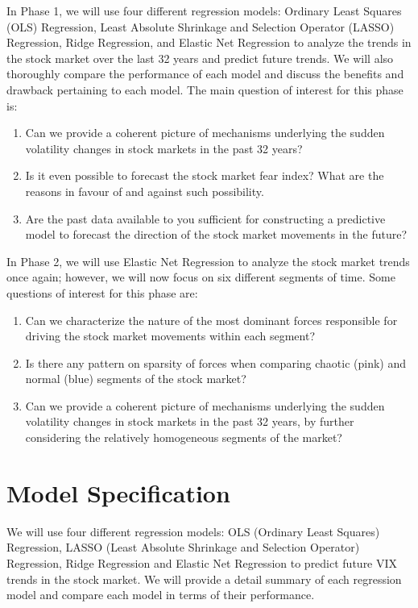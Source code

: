 \documentclass{article}
\begin{document}
In Phase 1, we will use four different regression models: Ordinary Least Squares (OLS) Regression, Least Absolute Shrinkage and Selection Operator (LASSO) Regression, Ridge Regression, and Elastic Net Regression to analyze the trends in the stock market over the last 32 years and predict future trends. We will also thoroughly compare the performance of each model and discuss the benefits and drawback pertaining to each model. The main question of interest for this phase is:
\begin{enumerate}
    \item Can we provide a coherent picture of mechanisms underlying the sudden volatility changes in stock markets in the past 32 years?
    \item Is it even possible to forecast the stock market fear index? What are the reasons in favour of and against such possibility. 
    \item Are the past data available to you sufficient for constructing a predictive model to forecast the direction of the stock market movements in the future?
\end{enumerate}

In Phase 2, we will use Elastic Net Regression to analyze the stock market trends once again; however, we will now focus on six different segments of time. Some questions of interest for this phase are: 
\begin{enumerate}
    \item Can we characterize the nature of the most dominant forces responsible for driving the stock market movements within each segment? 
    \item Is there any pattern on sparsity of forces when comparing chaotic (pink) and normal (blue) segments of the stock market?
    \item Can we provide a coherent picture of mechanisms underlying the sudden volatility changes in stock markets in the past 32 years, by further considering the relatively homogeneous segments of the market?
\end{enumerate}

\newpage
\section{Model Specification}
We will use four different regression models: OLS (Ordinary Least Squares) Regression, LASSO (Least Absolute Shrinkage and Selection Operator) Regression, Ridge Regression and Elastic Net Regression to predict future VIX trends in the stock market. We will provide a detail summary of each regression model and compare each model in terms of their performance.
\end{document}
